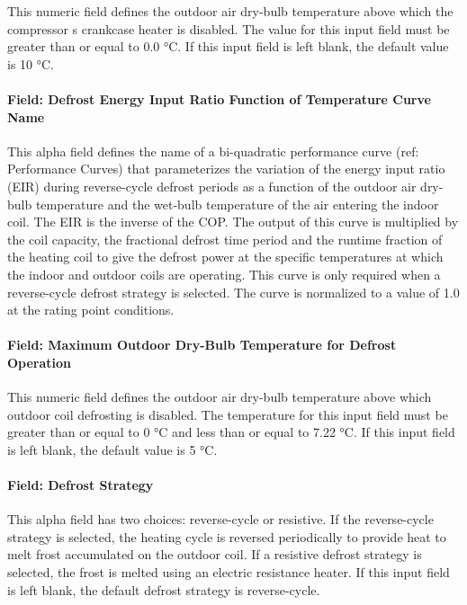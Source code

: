 This numeric field defines the outdoor air dry-bulb temperature above which the compressor s crankcase heater is disabled. The value for this input field must be greater than or equal to 0.0 °C. If this input field is left blank, the default value is 10 °C.

\paragraph{Field: Defrost Energy Input Ratio Function of Temperature Curve Name}\label{field-defrost-energy-input-ratio-function-of-temperature-curve-name-1}

This alpha field defines the name of a bi-quadratic performance curve (ref: Performance Curves) that parameterizes the variation of the energy input ratio (EIR) during reverse-cycle defrost periods as a function of the outdoor air dry-bulb temperature and the wet-bulb temperature of the air entering the indoor coil. The EIR is the inverse of the COP. The output of this curve is multiplied by the coil capacity, the fractional defrost time period and the runtime fraction of the heating coil to give the defrost power at the specific temperatures at which the indoor and outdoor coils are operating. This curve is only required when a reverse-cycle defrost strategy is selected. The curve is normalized to a value of 1.0 at the rating point conditions.

\paragraph{Field: Maximum Outdoor Dry-Bulb Temperature for Defrost Operation}\label{field-maximum-outdoor-dry-bulb-temperature-for-defrost-operation-1}

This numeric field defines the outdoor air dry-bulb temperature above which outdoor coil defrosting is disabled. The temperature for this input field must be greater than or equal to 0 °C and less than or equal to 7.22 °C. If this input field is left blank, the default value is 5 °C.

\paragraph{Field: Defrost Strategy}\label{field-defrost-strategy-1}

This alpha field has two choices: reverse-cycle or resistive. If the reverse-cycle strategy is selected, the heating cycle is reversed periodically to provide heat to melt frost accumulated on the outdoor coil. If a resistive defrost strategy is selected, the frost is melted using an electric resistance heater. If this input field is left blank, the default defrost strategy is reverse-cycle.

